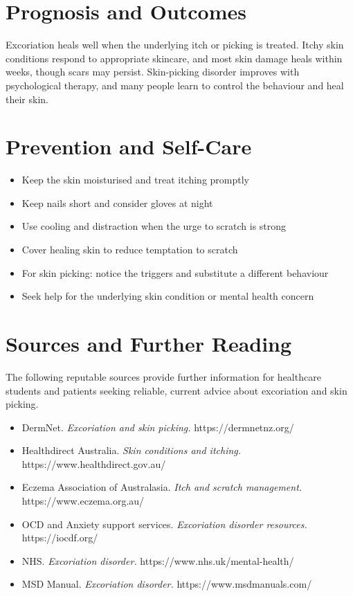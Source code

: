 \section*{Prognosis and Outcomes}
Excoriation heals well when the underlying itch or picking is treated. Itchy skin conditions respond to appropriate skincare, and most skin damage heals within weeks, though scars may persist. Skin-picking disorder improves with psychological therapy, and many people learn to control the behaviour and heal their skin.

\section*{Prevention and Self-Care}
\begin{itemize}
    \item Keep the skin moisturised and treat itching promptly
    \item Keep nails short and consider gloves at night
    \item Use cooling and distraction when the urge to scratch is strong
    \item Cover healing skin to reduce temptation to scratch
    \item For skin picking: notice the triggers and substitute a different behaviour
    \item Seek help for the underlying skin condition or mental health concern
\end{itemize}

\section*{Sources and Further Reading}
The following reputable sources provide further information for healthcare students and patients seeking reliable, current advice about excoriation and skin picking.
\begin{itemize}
    \item DermNet. \textit{Excoriation and skin picking.} https://dermnetnz.org/
    \item Healthdirect Australia. \textit{Skin conditions and itching.} https://www.healthdirect.gov.au/
    \item Eczema Association of Australasia. \textit{Itch and scratch management.} https://www.eczema.org.au/
    \item OCD and Anxiety support services. \textit{Excoriation disorder resources.} https://iocdf.org/
    \item NHS. \textit{Excoriation disorder.} https://www.nhs.uk/mental-health/
    \item MSD Manual. \textit{Excoriation disorder.} https://www.msdmanuals.com/
\end{itemize}
